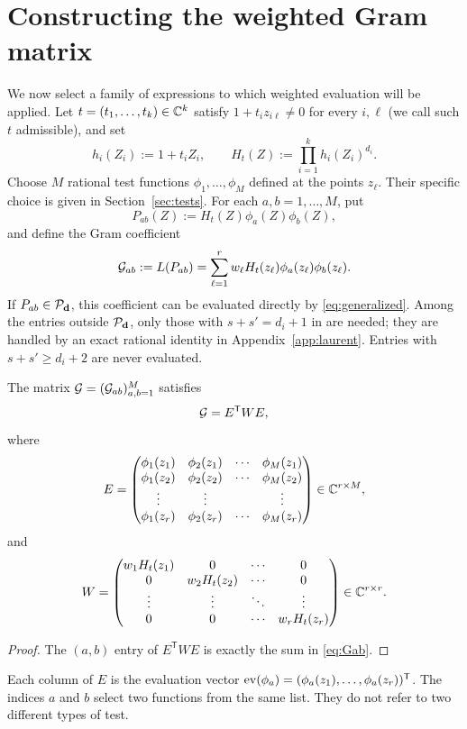 \section{Constructing the weighted Gram matrix}\label{sec:gram}

We now select a family of expressions to which weighted evaluation
will be applied. Let $t=(t_1,\ldots,t_k)\in\mathbb C^k$ satisfy
$1+t_i z_{i\ell}\ne0$ for every $i,\ell$ (we call such $t$
admissible), and set
\begin{equation}\label{eq:Ht}
h_i(Z_i):=1+t_iZ_i,
\qquad H_t(Z):=\prod_{i=1}^k h_i(Z_i)^{d_i}.
\end{equation}
Choose $M$ rational test functions $\phi_1,\ldots,\phi_M$ defined
at the points $z_\ell$. Their specific choice is given in
Section~\ref{sec:tests}. For each $a,b=1,\ldots,M$, put
\begin{equation}\label{eq:Pab}
P_{ab}(Z):=H_t(Z)\phi_a(Z)\phi_b(Z),
\end{equation}
and define the Gram coefficient
\begin{equation}\label{eq:Gab}
\mathcal G_{ab}:=L(P_{ab})
=\sum_{\ell=1}^r w_\ell H_t(z_\ell)
\phi_a(z_\ell)\phi_b(z_\ell).
\end{equation}
If $P_{ab}\in\mathcal P_{\mathbf d}$, this coefficient can be evaluated directly
by \eqref{eq:generalized}. Among the entries outside $\mathcal P_{\mathbf d}$, only those with $s+s'=d_i+1$ in
 are needed; they are
handled by an exact rational identity in Appendix~\ref{app:laurent}.
Entries with $s+s'\ge d_i+2$ are never evaluated.

\begin{lemma}\label{lem:gram}
The matrix $\mathcal G=(\mathcal G_{ab})_{a,b=1}^M$ satisfies
\begin{equation}\label{eq:factorization}
\mathcal G=E^{\mathsf T}WE,
\end{equation}
where
\begin{equation}\label{eq:E}
E=
\begin{pmatrix}
\phi_1(z_1)&\phi_2(z_1)&\cdots&\phi_M(z_1)\\
\phi_1(z_2)&\phi_2(z_2)&\cdots&\phi_M(z_2)\\
\vdots&\vdots&&\vdots\\
\phi_1(z_r)&\phi_2(z_r)&\cdots&\phi_M(z_r)
\end{pmatrix}\in\mathbb C^{r\times M},
\end{equation}
and
\begin{equation}\label{eq:W}
W=
\begin{pmatrix}
w_1H_t(z_1)&0&\cdots&0\\
0&w_2H_t(z_2)&\cdots&0\\
\vdots&\vdots&\ddots&\vdots\\
0&0&\cdots&w_rH_t(z_r)
\end{pmatrix}\in\mathbb C^{r\times r}.
\end{equation}
\end{lemma}
\begin{proof}
The $(a,b)$ entry of $E^{\mathsf T}WE$ is exactly the sum in
\eqref{eq:Gab}.
\end{proof}

Each column of $E$ is the evaluation vector
$\operatorname{ev}(\phi_a)=(\phi_a(z_1),\ldots,\phi_a(z_r))^{\mathsf T}$.
The indices $a$ and $b$ select two functions from the same list.
They do not refer to two different types of test.
